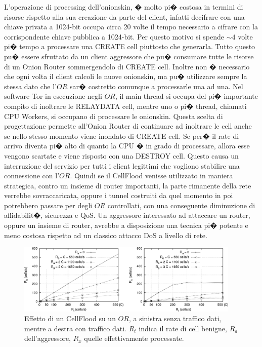 L'operazione di processing dell'onionskin, � molto pi� costosa in termini di risorse rispetto alla sua creazione da parte del client, infatti decifrare con una chiave privata a 1024-bit occupa circa 20 volte il tempo necessario a cifrare con la corrispondente chiave pubblica a 1024-bit. Per questo motivo si spende $\sim 4$ volte pi� tempo a processare una {\ttfamily CREATE} cell piuttosto che generarla.
Tutto questo pu� essere sfruttato da un client aggressore che pu� consumare tutte le risorse di un Onion Router sommergendolo di {\ttfamily CREATE} cell. Inoltre non � necessario che ogni volta il client calcoli le nuove onionskin, ma pu� utilizzare sempre la stessa dato che l'$OR$ sar� costretto comunque a processarle una ad una. Nel software Tor in esecuzione negli $OR$, il main thread si occupa del pi� importante compito di inoltrare le {\ttfamily RELAY\textunderscore DATA} cell, mentre uno o pi� thread, chiamati CPU Workers, si occupano di processare le onionskin. Questa scelta di progettazione permette all'Onion Router di continuare ad inoltrare le cell anche se nello stesso momento viene inondato di {\ttfamily CREATE} cell. Se per� il rate di arrivo diventa pi� alto di quanto la CPU � in grado di processare, allora esse vengono scartate e viene risposto con una {\ttfamily DESTROY} cell. Questo causa un interruzione del servizio per tutti i client legittimi che vogliono stabilire una connessione con l'$OR$. Quindi se il CellFlood venisse utilizzato in maniera strategica, contro un insieme di router importanti, la parte rimanente della rete verrebbe sovraccaricata, oppure i tunnel costruiti da quel momento in poi potrebbero passare per degli $OR$ controllati, con una conseguente diminuzione di affidabilit�, sicurezza e QoS.
Un aggressore interessato ad attaccare un router, oppure un insieme di router, avrebbe a disposizione una tecnica pi� potente e meno costosa rispetto ad un classico attacco DoS a livello di rete.

\begin{figure}[!htbp]
\centering
\includegraphics[width=0.95\textwidth]{./figure//cellflood}
\caption[Effetto di un CellFlood su un Onion Router.]{Effetto di un CellFlood su un $OR$, a sinistra senza traffico dati, mentre a destra con traffico dati. $R_{t}$ indica il rate di cell benigne, $R_{a}$ dell'aggressore, $R_{x}$ quelle effettivamente processate.}
\label{FIG:ClientPuzzles}
\end{figure}

